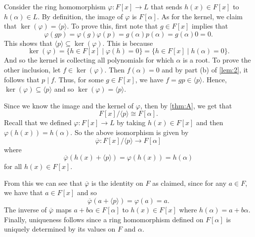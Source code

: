 \documentclass[leqno]{article}
\makeatletter
\theoremstyle{definition}
\theoremstyle{remark}
\let\oldproofname=\proofname
\renewcommand{\proofname}{\textit{\oldproofname}}
\theoremstyle{definition}
\renewenvironment{proof}[1][\proofname]{\par
  \pushQED{\qed}%
  \normalfont \topsep6\p@\@plus6\p@\relax
  \list{}{\leftmargin=0mm
          \rightmargin=0mm
          \settowidth{\itemindent}{\itshape#1}%
          \labelwidth=\itemindent
          \parsep=0pt \listparindent=0mm%
  }
  \item[\hskip\labelsep
        \itshape
    #1\@addpunct{.}]\ignorespaces
}{%
  \popQED\endlist\@endpefalse
}
\makeatother
\begin{document}
        \begin{proof}
            Consider the ring homomorphism $\varphi\colon F[x]\rightarrow L$ that sends $h(x)\in F[x]$ to $h(\alpha)\in L$. By definition, the image of $\varphi$ is $F[\alpha]$. As for the kernel, we claim that $\ker(\varphi)=\langle p\rangle$. To prove this, first note that $g\in F[x]$ implies that 
                \begin{equation*}
                    \varphi(gp)=\varphi(g)\varphi(p)=g(\alpha)p(\alpha)=g(\alpha)0=0.
                \end{equation*}
            This shows that $\langle p\rangle\subseteq\ker(\varphi)$. This is because
                \begin{equation*}
                    \ker(\varphi)=\{h\in F[x]\mid \varphi(h)=0\}=\{h\in F[x]\mid h(\alpha)=0\}.
                \end{equation*}
            And so the kernel is collecting all polynomials for which $\alpha$ is a root. To prove the other inclusion, let $f\in\ker(\varphi)$. Then $f(\alpha)=0$ and by part (b) of \cref{lem:2}, it follows that $p\mid f$. Thus, for some $g\in F[x]$, we have $f=gp\in\langle p\rangle$. Hence, $\ker(\varphi)\subseteq\langle p\rangle$ and so $\ker(\varphi)=\langle p\rangle$.\par\hspace{4mm} Since we know the image and the kernel of $\varphi$, then by \cref{thm:A}, we get that
                \begin{equation*}
                    F[x]/\langle p\rangle\cong F[\alpha].
                \end{equation*}
            Recall that we defined $\varphi\colon F[x]\rightarrow L$ by taking $h(x)\in F[x]$ and then $\varphi(h(x))=h(\alpha)$. So the above isomorphism is given by
                \begin{equation*}
                    \overline{\varphi}\colon F[x]/\langle p\rangle\rightarrow F[\alpha]
                \end{equation*}
            where
                \begin{equation*}
                    \overline{\varphi}(h(x)+\langle p\rangle)=\varphi(h(x))=h(\alpha)
                \end{equation*}
            for all $h(x)\in F[x]$.\par\hspace{4mm} From this we can see that $\overline{\varphi}$ is the identity on $F$ as claimed, since for any $a\in F$, we have that $a\in F[x]$ and so
                \begin{equation*}
                    \overline{\varphi}(a+\langle p\rangle)=\varphi(a)=a.
                \end{equation*}
            The inverse of $\overline{\varphi}$ maps $a+b\alpha\in F[\alpha]$ to $h(x)\in F[x]$ where $h(\alpha)=a+b\alpha$. Finally, uniqueness follows since a ring homomorphism defined on $F[\alpha]$ is uniquely determined by its values on $F$ and $\alpha$.
        \end{proof}
\end{document}
